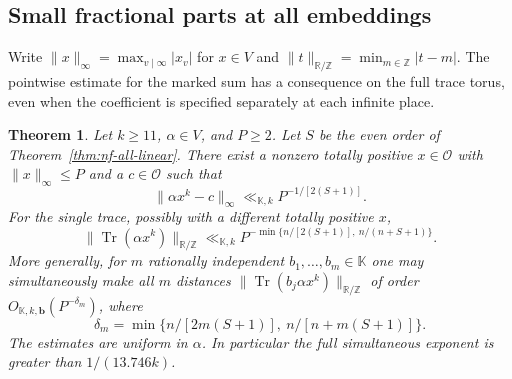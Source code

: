 \documentclass[11pt,letterpaper]{article}
\newtheorem{theorem}{Theorem}[section]
\theoremstyle{definition}
\numberwithin{equation}{section}
\begin{document}
\subsection{Small fractional parts at all embeddings}
\label{sec:nf-fractional}
Write $\|x\|_\infty=\max_{v\mid\infty}|x_v|$ for $x\in V$
and $\|t\|_{\mathbb R/\mathbb Z}=\min_{m\in\mathbb Z}|t-m|$.
The pointwise estimate for the marked sum has a consequence on the
full trace torus, even when the coefficient is specified separately
at each infinite place.
\begin{theorem}\label{thm:nf-fractional}
Let $k\ge11$, $\alpha\in V$, and $P\ge2$. Let $S$ be the even order of Theorem~\ref{thm:nf-all-linear}. There exist a nonzero
totally positive $x\in\mathcal O$ with $\|x\|_\infty\le P$ and a
$c\in\mathcal O$ such that
\[
                  \|\alpha x^k-c\|_\infty\ll_{\mathbb K,k} P^{-1/[2(S+1)]}.
\]
For the single trace, possibly with a different totally positive $x$,
\[
 \|\operatorname{Tr}(\alpha x^k)\|_{\mathbb R/\mathbb Z}
      \ll_{\mathbb K,k} P^{-\min\{n/[2(S+1)],\ n/(n+S+1)\}} .
\]
More generally, for $m$ rationally independent $b_1,\ldots,b_m\in\mathbb K$
one may simultaneously make all $m$ distances
$\|\operatorname{Tr}(b_j\alpha x^k)\|_{\mathbb R/\mathbb Z}$
of order $O_{\mathbb K,k,\mathbf b}(P^{-\delta_m})$, where
\[
          \delta_m=\min\{n/[2m(S+1)],\ n/[n+m(S+1)]\}.
\]
The estimates are uniform in $\alpha$. In particular the full simultaneous exponent is greater than $1/(13.746k)$.
\end{theorem}
\end{document}
